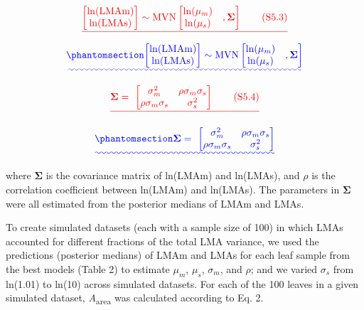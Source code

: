 \documentclass[
  12pt,
  letterpaper,
  DIV=11,
  numbers=noendperiod]{scrartcl}
\numberwithin{equation}{section} %
\providecommand{\DIFadd}[1]{{\protect\color{blue}\uwave{#1}}} %
\providecommand{\DIFdel}[1]{{\protect\color{red}\sout{#1}}}                      %
\providecommand{\DIFaddbegin}{} %
\providecommand{\DIFaddend}{} %
\providecommand{\DIFdelbegin}{} %
\providecommand{\DIFdelend}{} %
\newcommand{\DIFscaledelfig}{0.5}
\newlength{\DIFdelgraphicswidth} %
\newlength{\DIFdelgraphicsheight} %
\newcommand{\DIFaddincludegraphics}[2][]{{\color{blue}\fbox{\DIFOincludegraphics[#1]{#2}}}} %
\newcommand{\DIFdelincludegraphics}[2][]{%
\sbox{\DIFdelgraphicsbox}{\DIFOincludegraphics[#1]{#2}}%
\settoboxwidth{\DIFdelgraphicswidth}{\DIFdelgraphicsbox} %
\settoboxtotalheight{\DIFdelgraphicsheight}{\DIFdelgraphicsbox} %
\scalebox{\DIFscaledelfig}{%
\parbox[b]{\DIFdelgraphicswidth}{\usebox{\DIFdelgraphicsbox}\\[-\baselineskip] \rule{\DIFdelgraphicswidth}{0em}}\llap{\resizebox{\DIFdelgraphicswidth}{\DIFdelgraphicsheight}{%
\setlength{\unitlength}{\DIFdelgraphicswidth}%
\begin{picture}(1,1)%
\thicklines\linethickness{2pt} %
{\color[rgb]{1,0,0}\put(0,0){\framebox(1,1){}}}%
{\color[rgb]{1,0,0}\put(0,0){\line( 1,1){1}}}%
{\color[rgb]{1,0,0}\put(0,1){\line(1,-1){1}}}%
\end{picture}%
}\hspace*{3pt}}} %
} %
\DeclareRobustCommand{\DIFaddbegin}{\DIFOaddbegin \let\includegraphics\DIFaddincludegraphics} %
\DeclareRobustCommand{\DIFaddend}{\DIFOaddend \let\includegraphics\DIFOincludegraphics} %
\DeclareRobustCommand{\DIFdelbegin}{\DIFOdelbegin \let\includegraphics\DIFdelincludegraphics} %
\DeclareRobustCommand{\DIFdelend}{\DIFOaddend \let\includegraphics\DIFOincludegraphics} %
\begin{document}
\DIFdelbegin \[
\DIFdel{\begin{bmatrix}
\mathrm{ln}(\mathrm{LMAm})\\
\mathrm{ln}(\mathrm{LMAs})
\end{bmatrix}
\sim \mathrm{MVN}
\left[
\begin{matrix}
\ln(\mu_{m}) &\\
\ln(\mu_{s}) &
\end{matrix},
\boldsymbol{\Sigma}
\right] \qquad(\mathrm{S}5.3)
}\]%
\DIFdelend \DIFaddbegin \begin{equation}\DIFadd{\phantomsection\label{eq-sim_LMAm_LMAs}{
\begin{bmatrix}
\mathrm{ln}(\mathrm{LMAm})\\
\mathrm{ln}(\mathrm{LMAs})
\end{bmatrix}
\sim \mathrm{MVN}
\left[
\begin{matrix}
\ln(\mu_{m}) &\\
\ln(\mu_{s}) &
\end{matrix},
\boldsymbol{\Sigma}
\right]
}}\end{equation}\DIFaddend 

\DIFdelbegin \[
\DIFdel{\boldsymbol{\Sigma} = \
\begin{bmatrix}
\sigma_m^2 & \rho \sigma_m \sigma_s \\
\rho \sigma_m \sigma_s & \sigma_s^2 \\
\end{bmatrix} \qquad(\mathrm{S}5.4)
}\]%
\DIFdelend \DIFaddbegin \DIFadd{where
}

\begin{equation}\DIFadd{\phantomsection\label{eq-Sigma}{
\boldsymbol{\Sigma} = \
\begin{bmatrix}
\sigma_m^2 & \rho \sigma_m \sigma_s \\
\rho \sigma_m \sigma_s & \sigma_s^2 \\
\end{bmatrix}
}}\end{equation}\DIFaddend 

where \(\boldsymbol{\Sigma}\) is the covariance matrix of ln(LMAm) and
ln(LMAs), and \(\rho\) is the correlation coefficient between ln(LMAm)
and ln(LMAs). The parameters in \(\boldsymbol{\Sigma}\) were all
estimated from the posterior medians of LMAm and LMAs.

To create simulated datasets (each with a sample size of 100) in which
LMAs accounted for different fractions of the total LMA variance, we
used the predictions (posterior medians) of LMAm and LMAs for each leaf
sample from the best models (Table 2) to estimate \(\mu_m\), \(\mu_s\),
\(\sigma_m\), and \(\rho\); and we varied \(\sigma_s\) from ln(1.01) to
ln(10) across simulated datasets. For each of the 100 leaves in a given
simulated dataset, \emph{A}\textsubscript{area} was calculated according
to Eq. 2.
\end{document}
